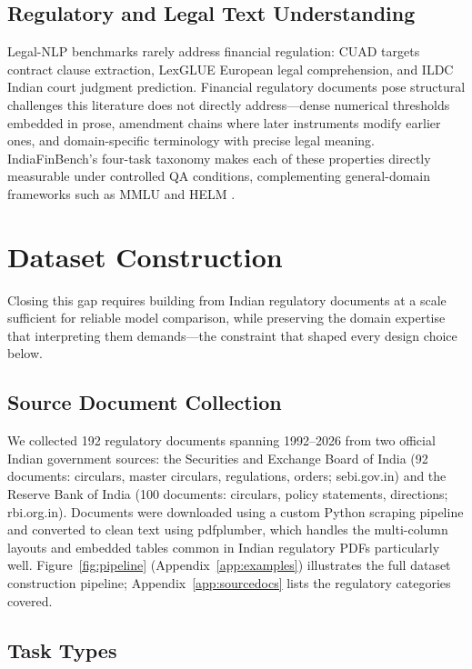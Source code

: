 \documentclass[11pt]{article}
\begin{document}
\subsection{Regulatory and Legal Text Understanding}

Legal-NLP benchmarks rarely address financial regulation: CUAD \citep{hendrycks2021cuad} targets contract clause extraction, LexGLUE \citep{chalkidis2022lexglue} European legal comprehension, and ILDC \citep{malik2021ildc} Indian court judgment prediction. Financial regulatory documents pose structural challenges this literature does not directly address---dense numerical thresholds embedded in prose, amendment chains where later instruments modify earlier ones, and domain-specific terminology with precise legal meaning. IndiaFinBench's four-task taxonomy makes each of these properties directly measurable under controlled QA conditions, complementing general-domain frameworks such as MMLU \citep{hendrycks2021mmlu} and HELM \citep{liang2022helm}.

\section{Dataset Construction}

Closing this gap requires building from Indian regulatory documents at a scale sufficient for reliable model comparison, while preserving the domain expertise that interpreting them demands---the constraint that shaped every design choice below.

\subsection{Source Document Collection}

We collected 192 regulatory documents spanning 1992--2026 from two official Indian government sources: the Securities and Exchange Board of India (92 documents: circulars, master circulars, regulations, orders; sebi.gov.in) and the Reserve Bank of India (100 documents: circulars, policy statements, directions; rbi.org.in). Documents were downloaded using a custom Python scraping pipeline and converted to clean text using pdfplumber, which handles the multi-column layouts and embedded tables common in Indian regulatory PDFs particularly well. Figure~\ref{fig:pipeline} (Appendix~\ref{app:examples}) illustrates the full dataset construction pipeline; Appendix~\ref{app:sourcedocs} lists the regulatory categories covered.

\subsection{Task Types}
\end{document}
